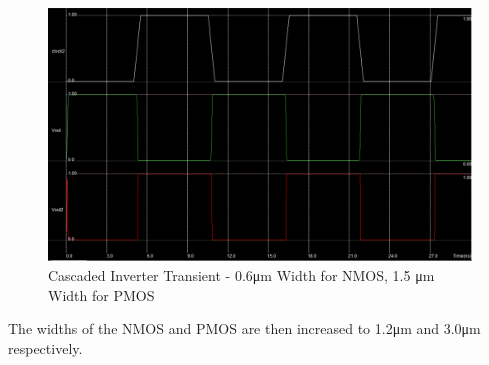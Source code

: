 \FloatBarrier

\FloatBarrier

\begin{figure}[h!]
	\centering
	\includegraphics[scale=0.50]{./images/cascaded_inverter_transient_06nmos15pmos.PNG}
	\caption{Cascaded Inverter Transient - 0.6\si{\micro\meter} Width for NMOS, 1.5 \si{\micro\meter} Width for PMOS}
	\label{fig:cascaded_inverter_transient_06nmos15pmos}
\end{figure}

\FloatBarrier

The widths of the NMOS and PMOS are then increased to 1.2\si{\micro\meter} and 3.0\si{\micro\meter} respectively.

\FloatBarrier

